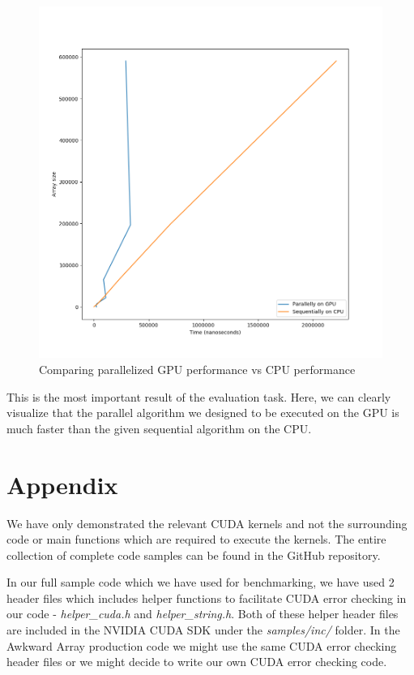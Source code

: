 \documentclass{article}
\begin{document}
\begin{figure}[H]
\hfill\includegraphics[scale=0.5]{Graphics/gpuvcpu.png}\hspace*{\fill}
\caption{Comparing parallelized GPU performance vs CPU performance}
\end{figure}
This is the most important result of the evaluation task. Here, we can clearly visualize that the parallel algorithm we designed to be executed on the GPU is much faster than the given sequential algorithm on the CPU.

\section{Appendix}
We have only demonstrated the relevant CUDA kernels and not the surrounding code or main functions which are required to execute the kernels. The entire collection of complete code samples can be found in the GitHub repository.\par
In our full sample code which we have used for benchmarking, we have used 2 header files which includes helper functions to facilitate CUDA error checking in our code - \textit{helper\_cuda.h} and \textit{helper\_string.h}. Both of these helper header files are included in the NVIDIA CUDA SDK under the \textit{samples/inc/} folder. In the Awkward Array production code we might use the same CUDA error checking header files or we might decide to write our own CUDA error checking code.



\end{document}
